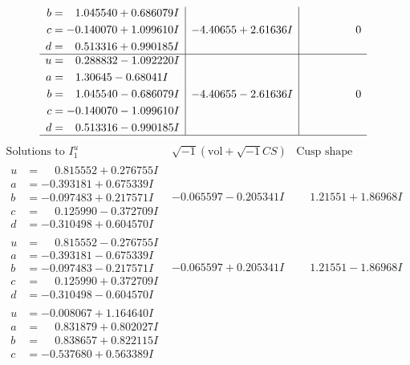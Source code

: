 \documentclass[1p]{elsarticle_modified}
\theoremstyle{definition}
\newcommand{\I}{\sqrt{-1}}
\begin{document}
$$\begin{array}{c|c|c}
\begin{aligned}
b &= \phantom{-}1.045540 + 0.686079 I \\
c &= -0.140070 + 1.099610 I \\
d &= \phantom{-}0.513316 + 0.990185 I\end{aligned}
 & -4.40655 + 2.61636 I & \phantom{-0.000000 } 0 \\ \hline\begin{aligned}
u &= \phantom{-}0.288832 - 1.092220 I \\
a &= \phantom{-}1.30645 - 0.68041 I \\
b &= \phantom{-}1.045540 - 0.686079 I \\
c &= -0.140070 - 1.099610 I \\
d &= \phantom{-}0.513316 - 0.990185 I\end{aligned}
 & -4.40655 - 2.61636 I & \phantom{-0.000000 } 0\\
 \hline 
 \end{array}$$\newpage$$\begin{array}{c|c|c}  
\text{Solutions to }I^u_{1}& \I (\text{vol} + \sqrt{-1}CS) & \text{Cusp shape}\\
 \hline 
\begin{aligned}
u &= \phantom{-}0.815552 + 0.276755 I \\
a &= -0.393181 + 0.675339 I \\
b &= -0.097483 + 0.217571 I \\
c &= \phantom{-}0.125990 - 0.372709 I \\
d &= -0.310498 + 0.604570 I\end{aligned}
 & -0.065597 - 0.205341 I & \phantom{-}1.21551 + 1.86968 I \\ \hline\begin{aligned}
u &= \phantom{-}0.815552 - 0.276755 I \\
a &= -0.393181 - 0.675339 I \\
b &= -0.097483 - 0.217571 I \\
c &= \phantom{-}0.125990 + 0.372709 I \\
d &= -0.310498 - 0.604570 I\end{aligned}
 & -0.065597 + 0.205341 I & \phantom{-}1.21551 - 1.86968 I \\ \hline\begin{aligned}
u &= -0.008067 + 1.164640 I \\
a &= \phantom{-}0.831879 + 0.802027 I \\
b &= \phantom{-}0.838657 + 0.822115 I \\
c &= -0.537680 + 0.563389 I \\

\end{aligned}
\end{array}$$
\end{document}
